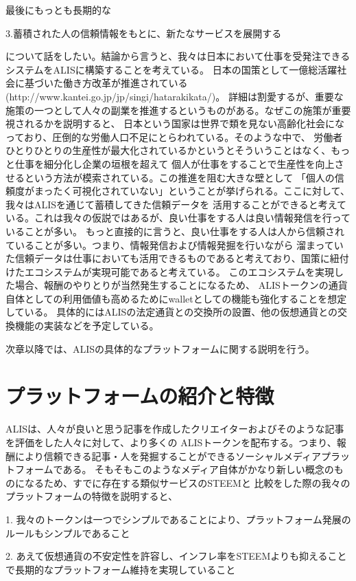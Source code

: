 \documentclass{jsarticle}
\begin{document}
最後にもっとも長期的な

3.蓄積された人の信頼情報をもとに、新たなサービスを展開する 

について話をしたい。結論から言うと、我々は日本において仕事を受発注できるシステムをALISに構築することを考えている。
日本の国策として一億総活躍社会に基づいた働き方改革が推進されている(http://www.kantei.go.jp/jp/singi/hatarakikata/)。
詳細は割愛するが、重要な施策の一つとして人々の副業を推進するというものがある。なぜこの施策が重要視されるかを説明すると、
日本という国家は世界で類を見ない高齢化社会になっており、圧倒的な労働人口不足にとらわれている。そのような中で、
労働者ひとりひとりの生産性が最大化されているかというとそういうことはなく、もっと仕事を細分化し企業の垣根を超えて
個人が仕事をすることで生産性を向上させるという方法が模索されている。この推進を阻む大きな壁として
「個人の信頼度がまったく可視化されていない」ということが挙げられる。ここに対して、我々はALISを通じて蓄積してきた信頼データを
活用することができると考えている。これは我々の仮説ではあるが、良い仕事をする人は良い情報発信を行っていることが多い。
もっと直接的に言うと、良い仕事をする人は人から信頼されていることが多い。つまり、情報発信および情報発掘を行いながら
溜まっていた信頼データは仕事においても活用できるものであると考えており、国策に紐付けたエコシステムが実現可能であると考えている。
このエコシステムを実現した場合、報酬のやりとりが当然発生することになるため、
ALISトークンの通貨自体としての利用価値も高めるためにwalletとしての機能も強化することを想定している。
具体的にはALISの法定通貨との交換所の設置、他の仮想通貨との交換機能の実装などを予定している。

次章以降では、ALISの具体的なプラットフォームに関する説明を行う。
\section{プラットフォームの紹介と特徴}
ALISは、人々が良いと思う記事を作成したクリエイターおよびそのような記事を評価をした人々に対して、より多くの
ALISトークンを配布する。つまり、報酬により信頼できる記事・人を発掘することができるソーシャルメディアプラットフォームである。
そもそもこのようなメディア自体がかなり新しい概念のものになるため、すでに存在する類似サービスのSTEEMと
比較をした際の我々のプラットフォームの特徴を説明すると、

1. 我々のトークンは一つでシンプルであることにより、プラットフォーム発展のルールもシンプルであること

2. あえて仮想通貨の不安定性を許容し、インフレ率をSTEEMよりも抑えることで長期的なプラットフォーム維持を実現していること
\end{document}
